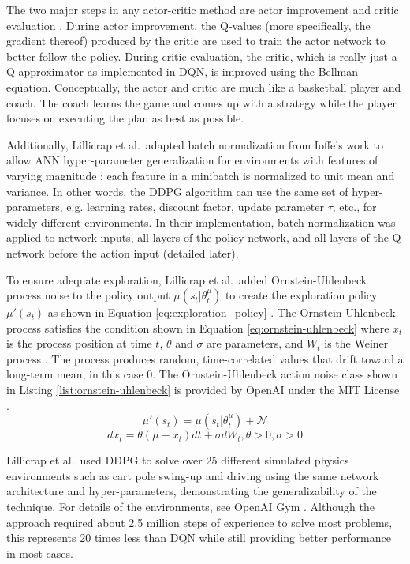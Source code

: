 The two major steps in any actor-critic method are actor improvement and critic evaluation \cite{actor_critic}. During actor improvement, the Q-values (more specifically, the gradient thereof) produced by the critic are used to train the actor network to better follow the policy. During critic evaluation, the critic, which is really just a Q-approximator as implemented in DQN, is improved using the Bellman equation. Conceptually, the actor and critic are much like a basketball player and coach. The coach learns the game and comes up with a strategy while the player focuses on executing the plan as best as possible.

Additionally, Lillicrap et al.\ adapted batch normalization from Ioffe's work to allow ANN hyper-parameter generalization for environments with features of varying magnitude \cite{2015arXiv150203167I}; each feature in a minibatch is normalized to unit mean and variance. In other words, the DDPG algorithm can use the same set of hyper-parameters, e.g. learning rates, discount factor, update parameter $\tau$, etc., for widely different environments. In their implementation, batch normalization was applied to network inputs, all layers of the policy network, and all layers of the Q network before the action input (detailed later).

To ensure adequate exploration, Lillicrap et al.\ added Ornstein-Uhlenbeck process noise to the policy output $\mu(s_t | \theta^\mu_t)$ to create the exploration policy $\mu'(s_t)$ as shown in Equation \ref{eq:exploration_policy} \cite{lillicrap_2016}. The Ornstein-Uhlenbeck process satisfies the condition shown in Equation \ref{eq:ornstein-uhlenbeck} where $x_t$ is the process position at time $t$, $\theta$ and $\sigma$ are parameters, and $W_t$ is the Weiner process \cite{uhlenbeck_ornstein}. The process produces random, time-correlated values that drift toward a long-term mean, in this case 0. The Ornstein-Uhlenbeck action noise class shown in Listing \ref{list:ornstein-uhlenbeck} is provided by OpenAI under the MIT License \cite{ddpg_noise}.
\begin{equation}
\label{eq:exploration_policy}
\mu'(s_t) = \mu(s_t | \theta^\mu_t) + \mathcal{N}
\end{equation}
\begin{equation}
\label{eq:ornstein-uhlenbeck}
dx_t = \theta(\mu-x_t) dt + \sigma dW_t, \theta>0, \sigma>0
\end{equation}

Lillicrap et al.\ used DDPG to solve over 25 different simulated physics environments such as cart pole swing-up and driving using the same network architecture and hyper-parameters, demonstrating the generalizability of the technique. For details of the environments, see OpenAI Gym \cite{openaigym}. Although the approach required about 2.5 million steps of experience to solve most problems, this represents 20 times less than DQN while still providing better performance in most cases.

